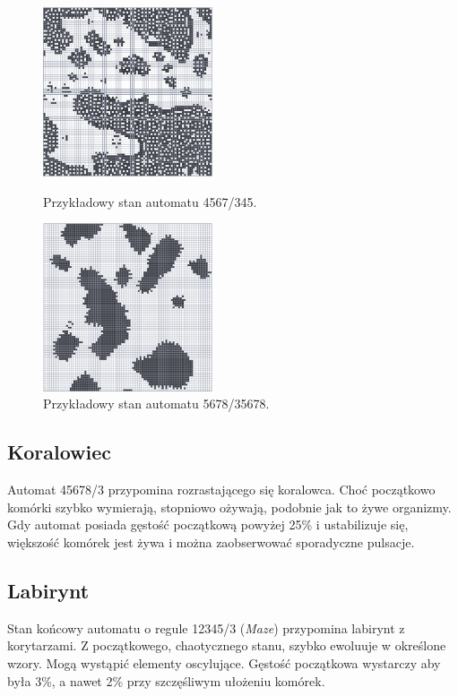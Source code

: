 \documentclass[12pt]{article}
\begin{document}
\begin{figure}[H]
\centering
\parbox{5cm}{
\includegraphics[width=5cm]{kolonie1.png}
\caption{Przykładowy stan automatu 4567/345. }
\label{fig:2figsA}}
\qquad
\begin{minipage}{5cm}
\includegraphics[width=5cm]{kolonie2.png}
\caption{Przykładowy stan automatu 5678/35678.}
\label{fig:2figsB}
\end{minipage}
\end{figure}

\subsection{Koralowiec}
Automat 45678/3 przypomina rozrastającego się koralowca. Choć początkowo komórki szybko wymierają, stopniowo ożywają, podobnie jak to żywe organizmy. Gdy automat posiada gęstość początkową powyżej 25\% i ustabilizuje się, większość komórek jest żywa i można zaobserwować sporadyczne pulsacje.

\subsection{Labirynt}
Stan końcowy automatu o regule 12345/3 (\textit{Maze}) przypomina labirynt z korytarzami. Z początkowego, chaotycznego stanu, szybko ewoluuje w określone wzory. Mogą wystąpić elementy oscylujące. Gęstość początkowa wystarczy aby była 3\%, a nawet 2\% przy szczęśliwym ułożeniu komórek.
\end{document}
